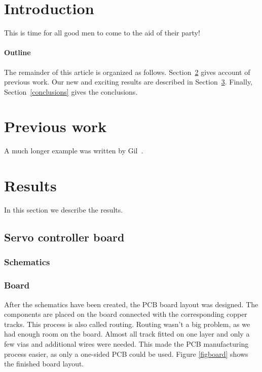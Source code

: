 \documentclass[12pt]{article}
\begin{document}
\maketitle

\begin{abstract}
\end{abstract}

\section{Introduction}
This is time for all good men to come to the aid of their party!

\paragraph{Outline}
The remainder of this article is organized as follows.
Section~\ref{previous work} gives account of previous work.
Our new and exciting results are described in Section~\ref{results}.
Finally, Section~\ref{conclusions} gives the conclusions.

\section{Previous work}\label{previous work}
A much longer \LaTeXe{} example was written by Gil~\cite{Gil:02}.

\section{Results}\label{results}
In this section we describe the results.

\subsection{Servo controller board}
\subsubsection{Schematics}
\subsubsection{Board}
After the schematics have been created, the PCB board layout was designed.
The components are placed on the board connected with the corresponding copper tracks.
This process is also called routing.
Routing wasn't a big problem, as we had enough room on the board.
Almost all track fitted on one layer and only a few vias and additional wires were needed.
This made the PCB manufacturing process easier, as only a one-sided PCB could be used.
Figure \ref{figboard} shows the finished board layout.
\end{document}
